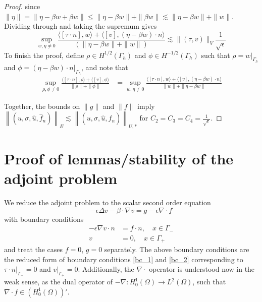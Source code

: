 \documentclass[11pt,onecolumn]{scrartcl}
\newcommand{\grad}{\nabla}
\renewcommand{\div}{\grad \cdot}
\begin{document}
\begin{proof}
since $\|\eta\| = \|\eta - \beta w + \beta w\| \leq \|\eta - \beta w\| + \|\beta w\| \lesssim \|\eta-\beta w\| + \|w\|$.  Dividing through and taking the supremum gives
\[
\sup_{w,\eta \neq 0} \frac{\langle[\tau\cdot n],w\rangle + \langle [v],\left(\eta - \beta w\right)\cdot n\rangle}{\left(\|\eta-\beta w\| + \|w\|\right)} \lesssim \|\left(\tau,v\right)\|_V\frac{1}{\sqrt{\epsilon}}
\]
To finish the proof, define $\rho \in H^{1/2}(\Gamma_h)$ and $\phi \in H^{-1/2}(\Gamma_h)$ such that $\rho = \left.w\right|_{\Gamma_h}$ and $\phi = \left.(\eta-\beta w)\cdot n\right|_{\Gamma_h}$, and note that
\begin{align*}
\sup_{\rho,\phi \neq 0} \frac{\langle [\tau\cdot n],\rho\rangle + \langle [v],\phi \rangle}{\|\rho\|+\|\phi\|} &= \sup_{w,\eta \neq 0} \frac{\langle [\tau\cdot n],w\rangle + \langle [v],\left(\eta - \beta w\right)\cdot n\rangle}{ \|w\|+\|\eta-\beta w\|} 
\end{align*}

Together, the bounds on $\|g\|$ and $\|f\|$ imply $\left\|\left(u,\sigma,\widehat{u},\widehat{f}_n\right)\right\|_{E} \lesssim \left\|\left(u,\sigma,\widehat{u},\widehat{f}_n\right)\right\|_{U,*}$ for $C_2 = C_3 = C_4 = \frac{1}{\sqrt{\epsilon}}$.  
\end{proof}


\section{Proof of lemmas/stability of the adjoint problem}

We reduce the adjoint problem to the scalar second order equation
\begin{equation}
- \epsilon \Delta v - \beta \cdot \grad v = g - \epsilon \div f \label{adjoint}
\end{equation}
with boundary conditions
\begin{align}
- \epsilon \grad v \cdot n &=f\cdot n, \quad x\in \Gamma_- \label{reducedbc_1}\\ 
v &= 0, \quad x\in \Gamma_+ \label{reducedbc_2}
\end{align}
and treat the cases $f=0$, $g=0$ separately.  The above boundary conditions are the reduced form of boundary conditions \eqref{bc_1} and \eqref{bc_2} corresponding to $\left.\tau\cdot n\right|_{\Gamma_-}=0$ and $\left.v\right|_{\Gamma_+}=0$. Additionally, the $\div$ operator is understood now in the weak sense, as the dual operator of $-\grad : H_0^1(\Omega) \rightarrow L^2(\Omega)$, such that $\div f \in \left(H_0^1(\Omega)\right)'$. 
\end{document}

